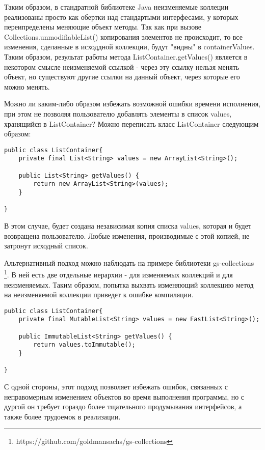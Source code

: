 Таким образом, в стандратной библиотеке Java неизменяемые коллеции реализованы просто как обертки над стандартыми интерфесами, у которых переипределены меняющие объект методы. Так как при вызове Collections.unmodifiableList() копирования элементов не происходит, то все изменения, сделанные в исходдной коллекции, будут "видны" в containerValues. Таким образом, результат работы метода ListContainer.getValues() является в некотором смысле неизменяемой ссылкой - через эту ссылку нельзя менять объект, но существуют другие ссылки на данный объект, через которые его можно менять.

Можно ли каким-либо образом избежать возможной ошибки времени исполнения, при этом не позволяя пользователю добавлять элементы в список values, хранящийся в ListContainer? Можно переписать класс ListContainer следующим образом:

\begin{lstlisting}[caption=Неизменяемый список, label=code:java_immutable_list]
public class ListContainer{
    private final List<String> values = new ArrayList<String>();   
    
    public List<String> getValues() {
        return new ArrayList<String>(values);
    }
    
}
\end{lstlisting}

В этом случае, будет создана независимая копия списка values, которая и будет возвращена пользователю. Любые изменения, производимые с этой копией, не затронут исходный список. 

Альтернативный подход можно наблюдать на примере библиотеки gs-collections \footnote{https://github.com/goldmansachs/gs-collections}. В ней есть две отдельные иерархии - для изменяемых коллекций и для неизменяемых. Таким образом, попытка выхвать изменяющий коллекцию метод на неизменяемой коллекции приведет к ошибке компиляции.

\begin{lstlisting}[caption=Неизменяемый список, label=code:java_immutable_list]
public class ListContainer{
    private final MutableList<String> values = new FastList<String>();   
    
    public ImmutableList<String> getValues() {
        return values.toImmutable();
    }
    
}
\end{lstlisting}

С одной стороны, этот подход позволяет избежать ошибок, связанных с неправомерным изменением объектов во время выполнения программы, но с дургой он требует гораздо более тщательного продумывания интерфейсов, а также более трудоемок в реализации. 

